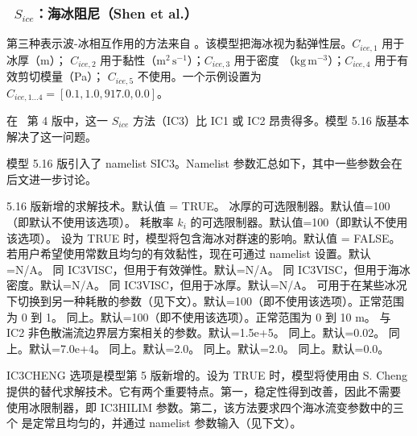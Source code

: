 \vsssub
\subsubsection{~$S_{ice}$：海冰阻尼（Shen et al.）} \label{sec:ICE3}
\vsssub


\noindent
第三种表示波-冰相互作用的方法来自\linebreak
\cite{art:WS10}。该模型把海冰视为黏弹性层。${C_{ice,1}}$ 用于冰厚（m）；
${C_{ice,2}}$ 用于黏性（$\mathrm{m^2\,s^{-1}}$）；${C_{ice,3}}$ 用于密度
（$\mathrm{kg\,m^{-3}}$）；${C_{ice,4}}$ 用于有效剪切模量（Pa）；
${C_{ice,5}}$ 不使用。一个示例设置为
${C_{ice,1...4}}=[0.1, 1.0, 917.0, 0.0]$。

在 \ws\ 第 4 版中，这一 $S_{ice}$ 方法（{\code IC3}）比 {\code IC1} 或 {\code IC2}
昂贵得多。模型 5.16 版基本解决了这一问题。

模型 5.16 版引入了 namelist {\F SIC3}。Namelist 参数汇总如下，其中一些参数会在
后文进一步讨论。

\begin{clist}
 {5.16 版新增的求解技术。默认值 = {\code TRUE}。}
 {冰厚的可选限制器。默认值=100（即默认不使用该选项）。}
 {耗散率 ${k_i}$ 的可选限制器。默认值=100（即默认不使用该选项）。}
 {设为 {\code TRUE} 时，模型将包含海冰对群速的影响。默认值 = {\code FALSE}。}
 {若用户希望使用常数且均匀的有效黏性，现在可通过 namelist 设置。默认=N/A。}
 {同 {\code IC3VISC}，但用于有效弹性。默认=N/A。}
 {同 {\code IC3VISC}，但用于海冰密度。默认=N/A。}
 {同 {\code IC3VISC}，但用于冰厚。默认=N/A。}
 {可用于在某些冰况下切换到另一种耗散的参数（见下文）。默认=100（即不使用该选项）。正常范围为 0 到 1。}
 {同上。默认=100（即不使用该选项）。正常范围为 0 到 10 m。}
 {与 IC2 非色散湍流边界层方案相关的参数。默认=1.5e+5。}
 {同上。默认=0.02。}
 {同上。默认=7.0e+4。}
 {同上。默认=2.0。}
 {同上。默认=2.0。}
 {同上。默认=0.0。}
\end{clist}

{\code IC3CHENG} 选项是模型第 5 版新增的。设为 {\code TRUE} 时，模型将使用由
S. Cheng 提供的替代求解技术。它有两个重要特点。第一，稳定性得到改善，因此不需要
使用冰限制器，即 {\code IC3HILIM} 参数。第二，该方法要求四个海冰流变参数中的三个
是定常且均匀的，并通过 namelist 参数输入（见下文）。

